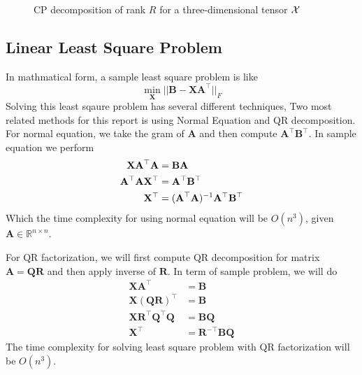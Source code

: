 \documentclass{article}
\newcommand{\mat}[1]{\mathbf{#1}}
\newcommand{\M}[2][]{\bm{#1{\mathbf{\MakeUppercase{#2}}}}} 		%
\newcommand{\V}[2][]{\bm{#1{\mathbf{\MakeLowercase{#2}}}}} 		%
\newcommand{\T}[2][]{#1{\mathbf{\cal{#2}}}} 						%
\begin{document}
\begin{figure}[ht!]
\caption{CP decomposition of rank $R$ for a three-dimensional tensor $\T{X}$ \label{fig:3d-cp-decomp}}
\end{figure}
\subsection*{Linear Least Square Problem}
In mathmatical form, a sample least square problem is like 
$$\min_{\mat{X}}||\mat{B} - \mat{X}\mat{A}^\top||_{F}$$
Solving this least sqaure problem has several different techniques, Two most related methods for this report
is using Normal Equation and QR decomposition.
For normal equation, we take the gram of $\mat{A}$ and then compute $\mat{A}^\top\mat{B}^\top$. In sample equation we perform
\begin{align}
\mat{X}\mat{A}^\top\mat{A} &= \mat{B}\mat{A} \nonumber \\
\mat{A}^\top\mat{A}\mat{X}^\top &= \mat{A}^\top\mat{B}^\top \nonumber \\
\mat{X}^\top &= (\M{A}^\top\mat{A})^{-1}\mat{A}^\top\mat{B}^\top \nonumber
\end{align}
Which the time complexity for using normal equation will be $O(n^3)$, given $\mat{A} \in \mathbb{R}^{n \times n}$.

For QR factorization, we will first compute QR decomposition for matrix $\mat{A} = \mat{Q}\mat{R}$ and then apply inverse of $\mat{R}$. In term
of sample problem, we will do
\begin{align}
  \mat{X}\mat{A}^\top &= \mat{B} \nonumber \\
  \mat{X}(\mat{Q}\mat{R})^\top &= \mat{B} \nonumber \\
  \mat{X}\mat{R}^\top\mat{Q}^\top\mat{Q} &= \mat{B}\mat{Q} \nonumber \\
  \mat{X}^\top &= \mat{R}^{-\top}\mat{B}\mat{Q} \nonumber
\end{align} 
The time complexity for solving least square problem with QR factorization will be $O(n^3)$.
\end{document}
